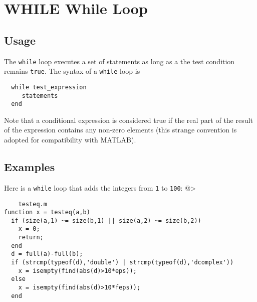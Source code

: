\section{WHILE While Loop}

\subsection{Usage}

The \verb|while| loop executes a set of statements as long as
a the test condition remains \verb|true|.  The syntax of a 
\verb|while| loop is
\begin{verbatim}
  while test_expression
     statements
  end
\end{verbatim}
Note that a conditional expression is considered true if 
the real part of the result of the expression contains
any non-zero elements (this strange convention is adopted
for compatibility with MATLAB).
\subsection{Examples}

Here is a \verb|while| loop that adds the integers from \verb|1|
to \verb|100|:
@>
\begin{verbatim}
    testeq.m
function x = testeq(a,b)
  if (size(a,1) ~= size(b,1) || size(a,2) ~= size(b,2))
    x = 0;
    return;
  end
  d = full(a)-full(b);
  if (strcmp(typeof(d),'double') | strcmp(typeof(d),'dcomplex'))
    x = isempty(find(abs(d)>10*eps));
  else
    x = isempty(find(abs(d)>10*feps));
  end
\end{verbatim}
